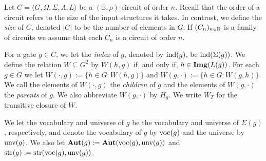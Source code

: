 \documentclass[../paper.tex]{subfiles}
\begin{document}
Let $C = \langle G, \Omega, \Sigma, \Lambda, L \rangle$ be a $(\mathbb{B},
\rho)$-circuit of order $n$. Recall that the order of a circuit refers to the
size of the input structures it takes. In contrast, we define the \emph{size} of
$C$, denoted $\vert C \vert$ to be the number of elements in $G$. If $(C_n)_{n
  \in \mathbb{N}}$ is a family of circuits we assume that each $C_n$ is a circuit of
order $n$.

For a gate $g \in C$, we let the \emph{index} of $g$, denoted by $\text{\upshape ind}(g)$, be
$\text{\upshape ind}(\Sigma(g))$. We define the relation $W \subseteq G^2$ by $W(h,g)$ if, and
only if, $h \in \text{\textbf{Img}}(L(g))$. For each $g \in G$ we let $W(\cdot, g) := \{h \in G
: W(h,g)\}$ and $W(g, \cdot) := \{h \in G : W(g,h)\}$. We call the elements of
$W(\cdot, g)$ the \emph{children} of $g$ and the elements of $W(g, \cdot)$ the
\emph{parents} of $g$. We also abbreviate $W(g, \cdot)$ by $H_g$. We write $W_T$
for the transitive closure of $W$.

We let the vocabulary and universe of $g$ be the vocabulary and universe of
$\Sigma(g)$, respectively, and denote the vocabulary of $g$ by $\text{voc}(g)$ and
the universe by $\text{unv}(g)$. We also let $\text{\textbf{Aut}}(g) := \text{\textbf{Aut}}(\text{voc}(g),
\text{unv}(g))$ and $\text{str}(g) := \text{str}(\text{voc}(g), \text{unv}(g))$.



\end{document}
